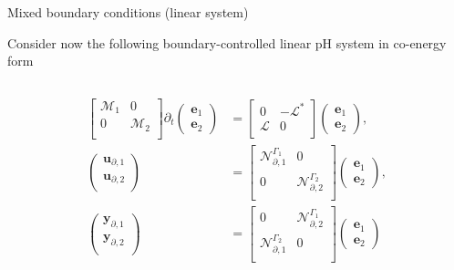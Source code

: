 \documentclass[aspectratio=169]{ISAE-Beamer}
\begin{document}
\begin{frame}{Mixed boundary conditions (linear system)}

Consider now the following boundary-controlled linear pH system in co-energy form 
\begin{columns}
\begin{column}{0.6\textwidth}
\begin{align*}
\begin{bmatrix}
\mathcal{M}_1 & 0 \\
0 & \mathcal{M}_2 \\
\end{bmatrix}
\partial_t \begin{pmatrix}
\bm{e}_1 \\ \bm{e}_2
\end{pmatrix} &= \begin{bmatrix}
0 &- \mathcal{L}^* \\
\mathcal{L} & 0 \\
\end{bmatrix}\begin{pmatrix}
\bm{e}_1 \\ \bm{e}_2
\end{pmatrix}, \\
\begin{pmatrix}
\bm{u}_{\partial, 1}\\
\bm{u}_{\partial, 2}\\
\end{pmatrix} &= \begin{bmatrix}
\mathcal{N}_{\partial, 1}^{\Gamma_1} & 0\\
0 & \mathcal{N}_{\partial, 2}^{\Gamma_2} \\
\end{bmatrix} \begin{pmatrix}
\bm{e}_1 \\ \bm{e}_2
\end{pmatrix}, \\
\begin{pmatrix}
\bm{y}_{\partial, 1}\\
\bm{y}_{\partial, 2}\\
\end{pmatrix} &= \begin{bmatrix}
0 & \mathcal{N}_{\partial, 2}^{\Gamma_1} \\
\mathcal{N}_{\partial, 1}^{\Gamma_2} & 0\\
\end{bmatrix} \begin{pmatrix}
\bm{e}_1 \\ \bm{e}_2

\end{pmatrix}
\end{align*}
\end{column}
\end{columns}
\end{frame}
\end{document}
